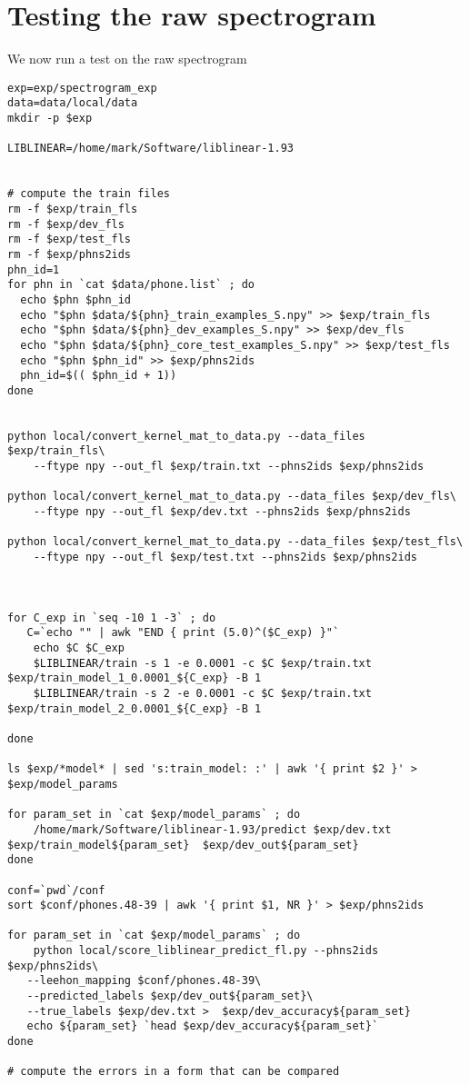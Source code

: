 \documentclass{article}
\begin{document}
\section{Testing the raw spectrogram}

We now run a test on the raw spectrogram

\begin{verbatim}
exp=exp/spectrogram_exp
data=data/local/data
mkdir -p $exp

LIBLINEAR=/home/mark/Software/liblinear-1.93


# compute the train files
rm -f $exp/train_fls
rm -f $exp/dev_fls
rm -f $exp/test_fls
rm -f $exp/phns2ids
phn_id=1
for phn in `cat $data/phone.list` ; do
  echo $phn $phn_id
  echo "$phn $data/${phn}_train_examples_S.npy" >> $exp/train_fls
  echo "$phn $data/${phn}_dev_examples_S.npy" >> $exp/dev_fls
  echo "$phn $data/${phn}_core_test_examples_S.npy" >> $exp/test_fls
  echo "$phn $phn_id" >> $exp/phns2ids
  phn_id=$(( $phn_id + 1))
done


python local/convert_kernel_mat_to_data.py --data_files $exp/train_fls\
    --ftype npy --out_fl $exp/train.txt --phns2ids $exp/phns2ids

python local/convert_kernel_mat_to_data.py --data_files $exp/dev_fls\
    --ftype npy --out_fl $exp/dev.txt --phns2ids $exp/phns2ids

python local/convert_kernel_mat_to_data.py --data_files $exp/test_fls\
    --ftype npy --out_fl $exp/test.txt --phns2ids $exp/phns2ids



for C_exp in `seq -10 1 -3` ; do
   C=`echo "" | awk "END { print (5.0)^($C_exp) }"`
    echo $C $C_exp
    $LIBLINEAR/train -s 1 -e 0.0001 -c $C $exp/train.txt $exp/train_model_1_0.0001_${C_exp} -B 1
    $LIBLINEAR/train -s 2 -e 0.0001 -c $C $exp/train.txt $exp/train_model_2_0.0001_${C_exp} -B 1

done

ls $exp/*model* | sed 's:train_model: :' | awk '{ print $2 }' > $exp/model_params

for param_set in `cat $exp/model_params` ; do
    /home/mark/Software/liblinear-1.93/predict $exp/dev.txt $exp/train_model${param_set}  $exp/dev_out${param_set}
done

conf=`pwd`/conf
sort $conf/phones.48-39 | awk '{ print $1, NR }' > $exp/phns2ids

for param_set in `cat $exp/model_params` ; do
    python local/score_liblinear_predict_fl.py --phns2ids $exp/phns2ids\
   --leehon_mapping $conf/phones.48-39\
   --predicted_labels $exp/dev_out${param_set}\
   --true_labels $exp/dev.txt >  $exp/dev_accuracy${param_set}
   echo ${param_set} `head $exp/dev_accuracy${param_set}`
done

# compute the errors in a form that can be compared
\end{verbatim}
\end{document}
